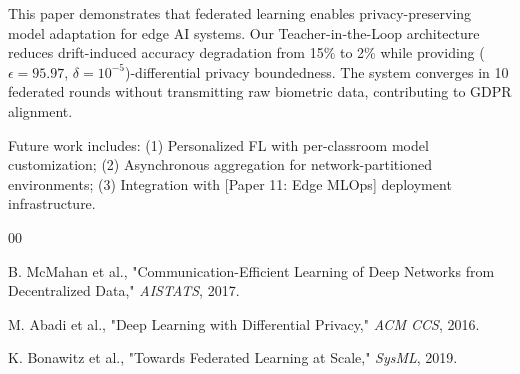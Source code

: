 \documentclass[conference]{IEEEtran}
\begin{document}
This paper demonstrates that federated learning enables privacy-preserving model adaptation for edge AI systems. Our Teacher-in-the-Loop architecture reduces drift-induced accuracy degradation from 15\% to 2\% while providing ($\epsilon=95.97$, $\delta=10^{-5}$)-differential privacy boundedness. The system converges in 10 federated rounds without transmitting raw biometric data, contributing to GDPR alignment.

Future work includes: (1) Personalized FL with per-classroom model customization; (2) Asynchronous aggregation for network-partitioned environments; (3) Integration with [Paper 11: Edge MLOps] deployment infrastructure.

\begin{thebibliography}{00}

 B. McMahan et al., "Communication-Efficient Learning of Deep Networks from Decentralized Data," \textit{AISTATS}, 2017.

 M. Abadi et al., "Deep Learning with Differential Privacy," \textit{ACM CCS}, 2016.

 K. Bonawitz et al., "Towards Federated Learning at Scale," \textit{SysML}, 2019.


\end{thebibliography}
\end{document}
